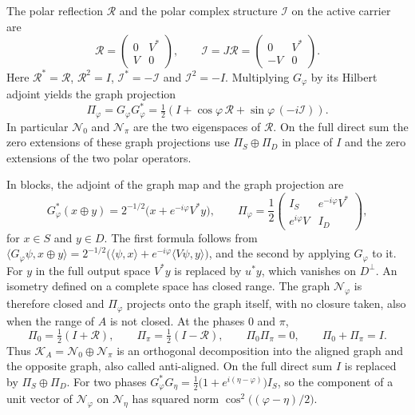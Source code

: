 \documentclass[11pt]{article}
\theoremstyle{definition}
\begin{document}
The polar reflection $\mathcal R$ and the polar complex structure $\mathcal I$ on the active carrier are
\[
 \mathcal R=\begin{pmatrix}0&V^*\\ V&0\end{pmatrix},\qquad
 \mathcal I=J\mathcal R=\begin{pmatrix}0&V^*\\-V&0\end{pmatrix}.
\]
Here $\mathcal R^*=\mathcal R$, $\mathcal R^2=I$, $\mathcal I^*=-\mathcal I$ and $\mathcal I^2=-I$. Multiplying $G_\varphi$ by its Hilbert adjoint yields the graph projection
\begin{equation}
 \Pi_\varphi=G_\varphi G_\varphi^*
  =\tfrac12\!\left(I+\cos\varphi\,\mathcal R+\sin\varphi\,(-i\mathcal I)\right).
 \label{eq:polar-graph-projector}
\end{equation}
In particular $\mathcal N_0$ and $\mathcal N_\pi$ are the two eigenspaces of $\mathcal R$. On the full direct sum the zero extensions of these graph projections use $\Pi_S\oplus\Pi_D$ in place of $I$ and the zero extensions of the two polar operators.

In blocks, the adjoint of the graph map and the graph projection are
\begin{equation}
 G_\varphi^*(x\oplus y)=2^{-1/2}\bigl(x+e^{-i\varphi}V^*y\bigr),\qquad
 \Pi_\varphi=\frac12\begin{pmatrix}I_S&e^{-i\varphi}V^*\\ e^{i\varphi}V&I_D\end{pmatrix},
 \label{eq:graph-adjoint-blocks}
\end{equation}
for $x\in S$ and $y\in D$. The first formula follows from $\langle G_\varphi\psi,x\oplus y\rangle=2^{-1/2}\bigl(\langle\psi,x\rangle+e^{-i\varphi}\langle V\psi,y\rangle\bigr)$, and the second by applying $G_\varphi$ to it. For $y$ in the full output space $V^*y$ is replaced by $u^*y$, which vanishes on $D^\perp$. An isometry defined on a complete space has closed range. The graph $\mathcal N_\varphi$ is therefore closed and $\Pi_\varphi$ projects onto the graph itself, with no closure taken, also when the range of $A$ is not closed. At the phases $0$ and $\pi$,
\begin{equation}
 \Pi_0=\tfrac12(I+\mathcal R),\qquad \Pi_\pi=\tfrac12(I-\mathcal R),\qquad
 \Pi_0\Pi_\pi=0,\qquad \Pi_0+\Pi_\pi=I .
 \label{eq:graph-aligned-opposite}
\end{equation}
Thus $\mathcal K_A=\mathcal N_0\oplus\mathcal N_\pi$ is an orthogonal decomposition into the aligned graph and the opposite graph, also called anti-aligned. On the full direct sum $I$ is replaced by $\Pi_S\oplus\Pi_D$. For two phases $G_\varphi^*G_\eta=\tfrac12\bigl(1+e^{i(\eta-\varphi)}\bigr)I_S$, so the component of a unit vector of $\mathcal N_\varphi$ on $\mathcal N_\eta$ has squared norm $\cos^2\bigl((\varphi-\eta)/2\bigr)$.
\end{document}
